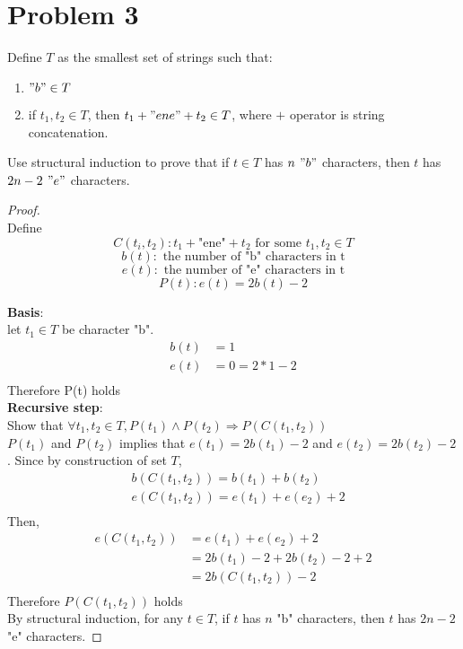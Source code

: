 \documentclass[11pt]{article}
\theoremstyle{plain}%
\theoremstyle{definition}
\theoremstyle{remark}
\begin{document}
\section*{Problem 3}
Define $T$ as the smallest set of strings such that:

\begin{enumerate}
  \item $" b " \in T$
  \item if $t_1, t_2\in T$, then $t_1 + "ene" + t_2 \in T$, where $+$ operator is string concatenation.
\end{enumerate}

Use structural induction to prove that if $t\in T$ has $n \textbf{ }"b"$ characters, then $t$ has $2n-2 \textbf{ }"e"$ characters.

\begin{proof}
  $ $\\

  Define \\
  \[
    C(t_i, t_2): t_1 + \text{"ene"} + t_2 \text{ for some } t_1, t_2 \in T
  \]
  \[
    b(t): \text{ the number of "b" characters in t}
  \]
  \[
    e(t): \text{ the number of "e" characters in t}
  \]
  \[
    P(t): e(t) = 2b(t)-2
  \]

  \textbf{Basis}:\\
  let $t_1\in T$ be character "b".
  \begin{align*}
    b(t) &= 1 \\
    e(t) &= 0 = 2*1 - 2 \\
  \end{align*}
  Therefore P(t) holds\\

  \textbf{Recursive step}:\\
  Show that $\forall t_1, t_2\in T, P(t_1) \land P(t_2) \Rightarrow P(C(t_1, t_2))$ \\
  $P(t_1)$ and $P(t_2)$ implies that $e(t_1) = 2b(t_1) -2$ and $e(t_2) = 2b(t_2) - 2$. Since by construction of set $T$,
  \begin{align*}
    & b(C(t_1, t_2)) = b(t_1) + b(t_2)\\
    & e(C(t_1, t_2)) = e(t_1) + e(e_2) + 2\\
  \end{align*}
  Then,
  \begin{align*}
    e(C(t_1, t_2)) &= e(t_1) + e(e_2) + 2\\
    &= 2b(t_1) - 2 + 2b(t_2) - 2 + 2\\
    &= 2b(C(t_1, t_2)) - 2\\
  \end{align*}
  Therefore $P(C(t_1, t_2))$ holds\\
  By structural induction, for any $t\in T$, if $t$ has $n$ "b" characters, then $t$ has $2n-2$ "e" characters.
\end{proof}
\end{document}
